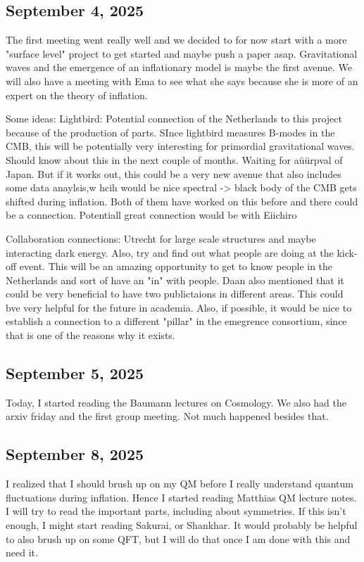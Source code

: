 \documentclass[12pt]{article}
\begin{document}
\subsection*{September 4, 2025}
The first meeting went really well and we decided to for now start with a more "surface level" project to get started and maybe push a paper asap. Gravitational waves and the emergence of an inflationary model is maybe the first avenue. We will also have a meeting with Ema to see what she says because she is more of an expert on the theory of inflation. 

Some ideas:
Lightbird: Potential connection of the Netherlands to this project because of the production of parts. SInce lightbird measures B-modes in the CMB, this will be potentially very interesting for primordial gravitational waves. Should know about this in the next couple of months. Waiting for aüürpval of Japan. But if it works out, this could be a very new avenue that also includes some data anaylsis,w hcih would be nice
spectral -> black body of the CMB gets shifted during inflation. Both of them have worked on this before and there could be a connection. Potentiall great connection would be with Eiichiro

Collaboration connections:
Utrecht for large scale structures and maybe interacting dark energy. Also, try and find out what people are doing at the kick-off event. This will be an amazing opportunity to get to know people in the Netherlands and sort of have an "in" with people. Daan also mentioned that it could be very beneficial to have two publictaions in different areas. This could bve very helpful for the future in academia. Also, if possible, it would be nice to establish a connection to a different "pillar" in the emegrence consortium, since that is one of the reasons why it exists. 

\subsection*{September 5, 2025}
Today, I started reading the Baumann lectures on Cosmology. We also had the arxiv friday and the first group meeting. Not much happened besides that.

\subsection*{September 8, 2025}
I realized that I should brush up on my QM before I really understand quantum fluctuations during inflation. Hence I started reading Matthias QM lecture notes. I will try to read the important parts, including about symmetries. If this isn't enough, I might start reading Sakurai, or Shankhar. It would probably be helpful to also brush up on some QFT, but I will do that once I am done with this and need it.
\end{document}
